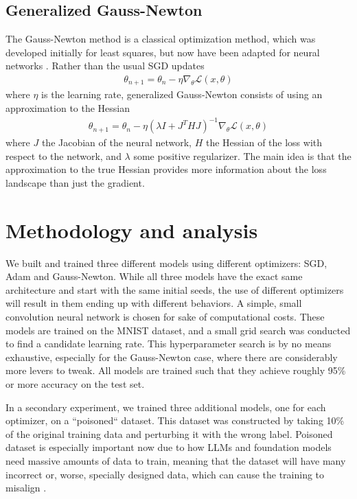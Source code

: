 \documentclass{article}
\begin{document}
    \subsection{Generalized Gauss-Newton}
    The Gauss-Newton method is a classical optimization method, which was developed initially for least squares, but now have been adapted for neural networks \citep{botev2017practicalgaussnewtonoptimisationdeep}.
    Rather than the usual SGD updates
    \begin{align*}
        \theta_{n+1} = \theta_n - \eta \nabla_{\theta} \mathcal L(x, \theta)
    \end{align*}
    where $\eta$ is the learning rate, generalized Gauss-Newton consists of using an approximation to the Hessian
    \begin{align*}
        \theta_{n+1} = \theta_n - \eta (\lambda I + J^THJ)^{-1} \nabla_{\theta} \mathcal L(x, \theta)
    \end{align*}
    where $J$ the Jacobian of the neural network, $H$ the Hessian of the loss with respect to the network, and $\lambda$ some positive regularizer.
    The main idea is that the approximation to the true Hessian provides more information about the loss landscape than just the gradient.


    \section{Methodology and analysis}
    We built and trained three different models using different optimizers: SGD, Adam and Gauss-Newton.
    While all three models have the exact same architecture and start with the same initial seeds, the use of different optimizers will result in them ending up with different behaviors.
    A simple, small convolution neural network is chosen for sake of computational costs.
    These models are trained on the MNIST dataset, and a small grid search was conducted to find a candidate learning rate.
    This hyperparameter search is by no means exhaustive, especially for the Gauss-Newton case, where there are considerably more levers to tweak.
    All models are trained such that they achieve roughly 95\% or more accuracy on the test set.

    In a secondary experiment, we trained three additional models, one for each optimizer, on a ``poisoned`` dataset.
    This dataset was constructed by taking 10\% of the original training data and perturbing it with the wrong label.
    Poisoned dataset is especially important now due to how LLMs and foundation models need massive amounts of data to train, meaning that the dataset will have many incorrect or, worse, specially designed data, which can cause the training to misalign \citep{cina2023wild}.
\end{document}
